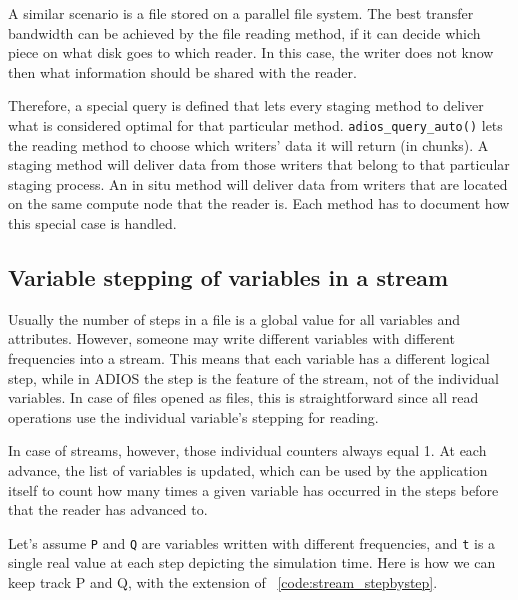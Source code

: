 A similar scenario is a file stored on a parallel file system. The best transfer bandwidth can be achieved by the file reading method, if it can decide which piece on what disk goes to which reader. In this case, the writer does not know then what information should be shared with the reader. 

Therefore, a special query is defined that lets every staging method to deliver what is considered optimal for that particular method. \lstinline+adios_query_auto()+ lets the reading method to choose which writers' data it will return (in chunks). A staging method will deliver data from those writers that belong to that particular staging process. An in situ method will deliver data from writers that are located on the same compute node that the reader is. Each method has to document how this special case is handled. 



\label {label_section_variable_stepping}
\subsection {Variable stepping of variables in a stream}
Usually the number of steps in a file is a global value for all variables and attributes. However, someone may write different variables with different frequencies into a stream. This means that each variable has a different logical step, while in ADIOS the step is the feature of the stream, not of the individual variables. In case of files opened as files, this is straightforward since all read operations use the individual variable's stepping for reading. 

In case of streams, however, those individual counters always equal 1. At each advance, the list of variables is updated, which can be used by the application itself to count how many times a given variable has occurred in the steps before that the reader has advanced to. 

Let's assume \verb+P+ and \verb+Q+ are variables written with different frequencies, and \verb+t+ is a single real value at each step depicting the simulation time. Here is how we can keep track P and Q, with the extension of  \lstlistingname~\ref{code:stream_stepbystep}.

